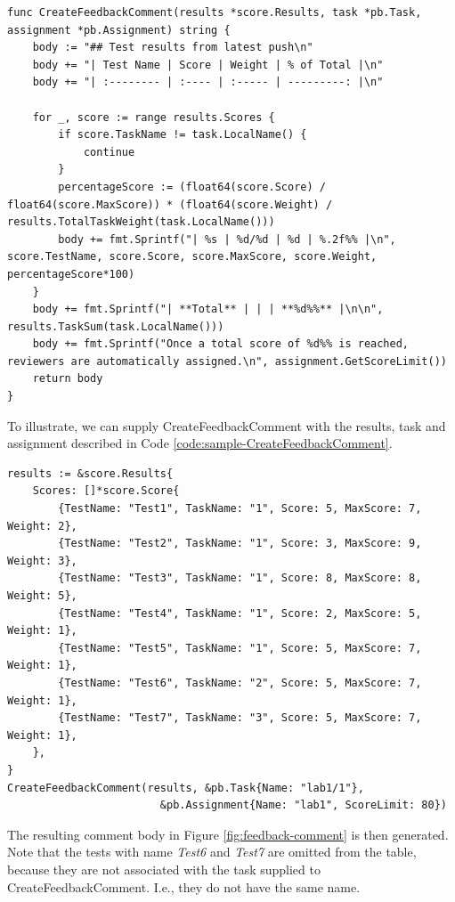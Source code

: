 \begin{lstlisting}[caption={The CreateFeedbackComment function}, label={code:CreateFeedbackComment}, language=Golang]
func CreateFeedbackComment(results *score.Results, task *pb.Task, assignment *pb.Assignment) string {
	body := "## Test results from latest push\n"
	body += "| Test Name | Score | Weight | % of Total |\n"
	body += "| :-------- | :---- | :----- | ---------: |\n"

	for _, score := range results.Scores {
		if score.TaskName != task.LocalName() {
			continue
		}
		percentageScore := (float64(score.Score) / float64(score.MaxScore)) * (float64(score.Weight) / results.TotalTaskWeight(task.LocalName()))
		body += fmt.Sprintf("| %s | %d/%d | %d | %.2f%% |\n", score.TestName, score.Score, score.MaxScore, score.Weight, percentageScore*100)
	}
	body += fmt.Sprintf("| **Total** | | | **%d%%** |\n\n", results.TaskSum(task.LocalName()))
	body += fmt.Sprintf("Once a total score of %d%% is reached, reviewers are automatically assigned.\n", assignment.GetScoreLimit())
	return body
}
\end{lstlisting}

To illustrate, we can supply CreateFeedbackComment with the results, task and assignment described in Code \ref{code:sample-CreateFeedbackComment}.
\begin{lstlisting}[caption={Example of a CreateFeedbackComment run}, label={code:sample-CreateFeedbackComment}, language=Golang]
results := &score.Results{
	Scores: []*score.Score{
		{TestName: "Test1", TaskName: "1", Score: 5, MaxScore: 7, Weight: 2},
		{TestName: "Test2", TaskName: "1", Score: 3, MaxScore: 9, Weight: 3},
		{TestName: "Test3", TaskName: "1", Score: 8, MaxScore: 8, Weight: 5},
		{TestName: "Test4", TaskName: "1", Score: 2, MaxScore: 5, Weight: 1},
		{TestName: "Test5", TaskName: "1", Score: 5, MaxScore: 7, Weight: 1},
		{TestName: "Test6", TaskName: "2", Score: 5, MaxScore: 7, Weight: 1},
		{TestName: "Test7", TaskName: "3", Score: 5, MaxScore: 7, Weight: 1},
	},
}
CreateFeedbackComment(results, &pb.Task{Name: "lab1/1"}, 
                        &pb.Assignment{Name: "lab1", ScoreLimit: 80})
\end{lstlisting}

The resulting comment body in Figure \ref{fig:feedback-comment} is then generated.
Note that the tests with name \textit{Test6} and \textit{Test7} are omitted from the table, because they are not associated with the task supplied to CreateFeedbackComment.
I.e., they do not have the same name.

